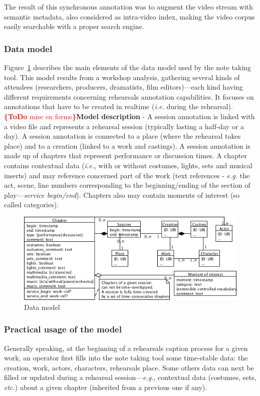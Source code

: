 \documentclass[conference]{IEEEtran}
\newcommand{\todo}[1]{\noindent\textcolor{red}{{\bf \{ToDo} #1{\bf \}}}}
\begin{document}
The result of this synchronous annotation was to augment the video stream with semantic metadata, also considered as intra-video index, making the video corpus easily searchable with a proper search engine.

\subsubsection{Data model} Figure~\ref{fig_data_model} describes the main elements of the data model used by the note taking tool. This model results from a workshop analysis, gathering several kinds of attendees (researchers, producers, dramatists, film editors)---each kind having different requirements concerning rehearsals annotation capabilities. It focuses on annotations that have to be created in realtime (\emph{i.e.} during the rehearsal). \newline
\todo{mise en forme}\textbf{Model description} - A session annotation is linked with a video file and represents a rehearsal session (typically lasting a half-day or a day). A session annotation is connected to a place (where the rehearsal takes place) and to a creation (linked to a work and castings). A session annotation is made up of chapters that represent performance or discussion times. A chapter contains contextual data (\emph{i.e.}, with or without costumes, lights, sets and musical inserts) and may reference concerned part of the work (text references - \emph{e.g.} the act, scene, line numbers corresponding to the beginning/ending of the section of play---\textit{service begin/end}). Chapters also may contain moments of interest (so called categories).
\begin{figure}[ht]
\centering
\includegraphics[width=\columnwidth]{UMLet_Data_model}
\caption{Data model}
\label{fig_data_model}
\end{figure}
\subsubsection{Practical usage of the model} Generally speaking, at the beginning of a rehearsals caption process for a given work, an operator first fills into the note taking tool some time-stable data: the creation, work, actors, characters, rehearsals place. Some others data can next be filled or updated during a rehearsal session---\emph{e.g.}, contextual data (costumes, sets, \emph{etc.}) about a given chapter (inherited from a previous one if any).
\end{document}
